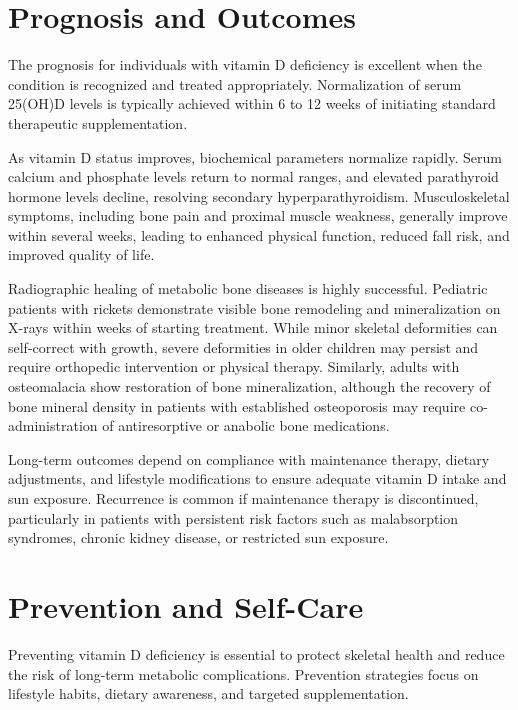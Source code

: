 \section*{Prognosis and Outcomes}
The prognosis for individuals with vitamin D deficiency is excellent when the condition is recognized and treated appropriately. Normalization of serum 25(OH)D levels is typically achieved within 6 to 12 weeks of initiating standard therapeutic supplementation.

As vitamin D status improves, biochemical parameters normalize rapidly. Serum calcium and phosphate levels return to normal ranges, and elevated parathyroid hormone levels decline, resolving secondary hyperparathyroidism. Musculoskeletal symptoms, including bone pain and proximal muscle weakness, generally improve within several weeks, leading to enhanced physical function, reduced fall risk, and improved quality of life.

Radiographic healing of metabolic bone diseases is highly successful. Pediatric patients with rickets demonstrate visible bone remodeling and mineralization on X-rays within weeks of starting treatment. While minor skeletal deformities can self-correct with growth, severe deformities in older children may persist and require orthopedic intervention or physical therapy. Similarly, adults with osteomalacia show restoration of bone mineralization, although the recovery of bone mineral density in patients with established osteoporosis may require co-administration of antiresorptive or anabolic bone medications.

Long-term outcomes depend on compliance with maintenance therapy, dietary adjustments, and lifestyle modifications to ensure adequate vitamin D intake and sun exposure. Recurrence is common if maintenance therapy is discontinued, particularly in patients with persistent risk factors such as malabsorption syndromes, chronic kidney disease, or restricted sun exposure.

\section*{Prevention and Self-Care}
Preventing vitamin D deficiency is essential to protect skeletal health and reduce the risk of long-term metabolic complications. Prevention strategies focus on lifestyle habits, dietary awareness, and targeted supplementation.

